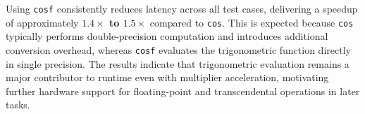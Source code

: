 Using \texttt{cosf} consistently reduces latency across all test cases, delivering a speedup of approximately \textbf{$1.4\times$ to $1.5\times$} compared to \texttt{cos}. 
This is expected because \texttt{cos} typically performs double-precision computation and introduces additional conversion overhead, whereas \texttt{cosf} evaluates the trigonometric function directly in single precision. 
The results indicate that trigonometric evaluation remains a major contributor to runtime even with multiplier acceleration, motivating further hardware support for floating-point and transcendental operations in later tasks.